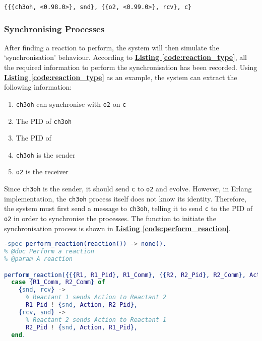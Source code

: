 \documentclass[12pt, a4paper]{article}
\begin{document}
\begin{lstlisting}[basicstyle=\ttfamily, label=code:reaction_type,
  caption=An example of a possible reaction,xleftmargin=.13\textwidth]
  {{{ch3oh, <0.98.0>}, snd}, {{o2, <0.99.0>}, rcv}, c}
\end{lstlisting}

\subsubsection{Synchronising Processes} \label{subsubsec:sync}
After finding a reaction to perform, the system will then simulate the `synchronisation' behaviour.
According to \hyperref[code:reaction_type]{\textbf{Listing \ref*{code:reaction_type}}}, all the
required information to perform the synchronisation has been recorded. Using
\hyperref[code:reaction_type]{\textbf{Listing \ref*{code:reaction_type}}} as an example, the system
can extract the following information:
\begin{enumerate}
  \item \texttt{ch3oh} can synchronise with \texttt{o2} on \texttt{c}
  \item The PID of \texttt{ch3oh}
  \item The PID of 
  \item \texttt{ch3oh} is the sender
  \item \texttt{o2} is the receiver
\end{enumerate}

Since \texttt{ch3oh} is the sender, it should send \texttt{c} to \texttt{o2} and
evolve. However, in Erlang implementation, the \texttt{ch3oh} process itself does not know its
identity. Therefore, the system must first send a message to \texttt{ch3oh}, telling it to send
\texttt{c} to the PID of \texttt{o2} in order to synchronise the processes. The function to initiate
the synchronisation process is shown in \hyperref[code:perform_reaction]{\textbf{Listing
\ref*{code:perform_reaction}}}.

\begin{lstlisting}[language=erlang, basicstyle=\footnotesize, label=code:perform_reaction,
  caption=A function to perform the reaction]
-spec perform_reaction(reaction()) -> none().
% @doc Perform a reaction
% @param A reaction

perform_reaction({{{R1, R1_Pid}, R1_Comm}, {{R2, R2_Pid}, R2_Comm}, Action}) ->
  case {R1_Comm, R2_Comm} of
    {snd, rcv} ->
      % Reactant 1 sends Action to Reactant 2
      R1_Pid ! {snd, Action, R2_Pid},
    {rcv, snd} ->
      % Reactant 2 sends Action to Reactant 1
      R2_Pid ! {snd, Action, R1_Pid},
  end.
\end{lstlisting}
\end{document}
